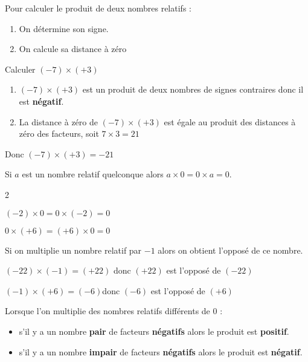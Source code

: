 \begin{methode*1}
  Pour calculer le produit de deux nombres relatifs :
  \begin{enumerate}
    \item On détermine son signe.
    \item On calcule sa distance à zéro
  \end{enumerate}
  \exercice
  Calculer $(-7)\times (+3)$
  \correction
  \begin{enumerate}
    \item $(-7)\times (+3)$ est un produit de deux nombres de signes contraires donc il est \textbf{négatif}.
    \item La distance à zéro de $(-7)\times (+3)$ est égale au produit des distances à zéro des facteurs, soit $7\times 3 =21$
  \end{enumerate}
  Donc $(-7)\times (+3) = -21$
\end{methode*1}

\begin{propriete}
  Si $a$ est un nombre relatif quelconque alors $a\times0=0\times a=0$.
\end{propriete}

\begin{multicols}2
  \begin{exemple*1}
    $(-2)\times 0=0\times (-2)=0$
  \end{exemple*1}
  \begin{exemple*1}
    $0\times (+6)=(+6)\times 0=0$
  \end{exemple*1}
\end{multicols}

\begin{propriete}
  Si on multiplie un nombre relatif par $-1$ alors on obtient l'opposé de ce nombre.
\end{propriete}

\begin{exemple*1}
  $(-22)\times (-1)=(+22)$ donc $(+22)$ est l'opposé de $(-22)$
\end{exemple*1}

\begin{exemple*1}
  $(-1)\times(+6)=(-6)$donc  $(-6)$ est l'opposé de $(+6)$
\end{exemple*1}

\begin{propriete}
  Lorsque l'on multiplie des nombres relatifs différents de $0$ :
  \begin{itemize}
    \item s'il y a un nombre {\bf pair} de facteurs {\bf n\'egatifs} alors le produit est {\bf positif}.
    \item s'il y a un nombre {\bf impair} de facteurs {\bf n\'egatifs} alors le produit est {\bf n\'egatif}.
  \end{itemize}
\end{propriete}


